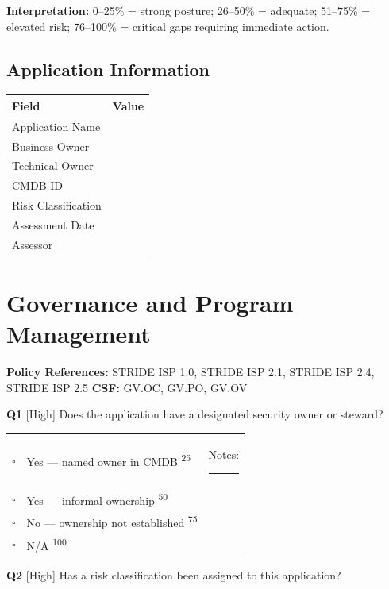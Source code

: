 \documentclass[11pt,landscape]{article}
\begin{document}
\vspace{0.2cm}
{\small\textbf{Interpretation:} 0--25\% = strong posture; 26--50\% = adequate; 51--75\% = elevated risk; 76--100\% = critical gaps requiring immediate action.}

\subsection{Application Information}
\begin{tabularx}{\textwidth}{lX}
\toprule
\textbf{Field} & \textbf{Value} \\
\midrule
Application Name & \\
Business Owner & \\
Technical Owner & \\
CMDB ID & \\
Risk Classification & \\
Assessment Date & \\
Assessor & \\
\bottomrule
\end{tabularx}

\newpage
\section{Governance and Program Management}

\textbf{Policy References:} STRIDE ISP 1.0, STRIDE ISP 2.1, STRIDE ISP 2.4, STRIDE ISP 2.5 \hfill \textbf{CSF:} GV.OC, GV.PO, GV.OV

\noindent\colorbox{highbg}{\textbf{Q1} [High]} Does the application have a designated security owner or steward?

\begin{tabularx}{\textwidth}{cXX}
$\square$ & Yes --- named owner in CMDB \textsuperscript{\scriptsize\textcolor{stridegray}{25}} & Notes: \rule{4cm}{0.4pt} \\
$\square$ & Yes --- informal ownership \textsuperscript{\scriptsize\textcolor{stridegray}{50}} &  \\
$\square$ & No --- ownership not established \textsuperscript{\scriptsize\textcolor{stridegray}{75}} &  \\
$\square$ & N/A \textsuperscript{\scriptsize\textcolor{stridegray}{100}} &  \\
\end{tabularx}

\vspace{0.3cm}

\noindent\colorbox{highbg}{\textbf{Q2} [High]} Has a risk classification been assigned to this application?
\end{document}

